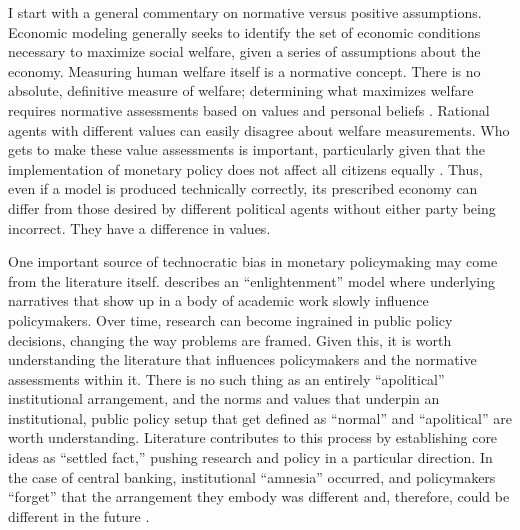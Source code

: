 \documentclass[12pt,a4paper]{article}
\begin{document}
\begin{doublespace}
I start with a general commentary on normative versus positive assumptions. Economic modeling generally seeks to identify the set of economic conditions necessary to maximize social welfare, given a series of assumptions about the economy. Measuring human welfare itself is a normative concept. There is no absolute, definitive measure of welfare; determining what maximizes welfare requires normative assessments based on values and personal beliefs \parencite{cairney_understanding_2011}. Rational agents with different values can easily disagree about welfare measurements. Who gets to make these value assessments is important, particularly given that the implementation of monetary policy does not affect all citizens equally \parencite{stiglitz_price_2013}. Thus, even if a model is produced technically correctly, its prescribed economy can differ from those desired by different political agents without either party being incorrect. They have a difference in values.


One important source of technocratic bias in monetary policymaking may come from the literature itself. \textcite{weiss_many_1979} describes an ``enlightenment'' model where underlying narratives that show up in a body of academic work slowly influence policymakers. Over time, research can become ingrained in public policy decisions, changing the way problems are framed. Given this, it is worth understanding the literature that influences policymakers and the normative assessments within it. There is no such thing as an entirely ``apolitical” institutional arrangement, and the norms and values that underpin an institutional, public policy setup that get defined as ``normal'' and ``apolitical'' are worth understanding. Literature contributes to this process by establishing core ideas as ``settled fact,'' pushing research and policy in a particular direction. In the case of central banking, institutional ``amnesia'' occurred, and policymakers ``forget'' that the arrangement they embody was different and, therefore, could be different in the future \parencite{mcnamara_rational_2002}. 



\end{doublespace}
\end{document}
